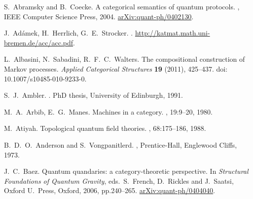 \begin{thebibliography}{RSW00}

    S.\ Abramsky and B.\ Coecke.
    \newblock A categorical semantics of quantum protocols.
    , IEEE Computer Science Press, 2004.
    \newblock \href{http://arxiv.org/abs/quant-ph/0402130}{arXiv:quant-ph/0402130}.

    J.\ Ad\'amek, H.\ Herrlich, G.\ E.\ Strocker. 
    .
    \newblock
    \href{http://katmat.math.uni-bremen.de/acc/acc.pdf}{http://katmat.math.uni-bremen.de/acc/acc.pdf}.



    L.\ Albasini, N.\ Sabadini, R.\ F.\ C.\ Walters. 
    \newblock The compositional construction of Markov processes.
    \newblock \emph{Applied Categorical Structures} {\bf 19} (2011), 425--437. 
    \newblock doi: 10.1007/s10485-010-9233-0.

    S.\ J.\ Ambler. 
    . 
    \newblock PhD thesis, University of Edinburgh, 1991.

    M.\ A.\ Arbib, E.\ G.\ Manes. 
    \newblock Machines in a category.
    , 19:9--20, 1980.


     M.\ Atiyah. 
    \newblock Topological quantum field theories.
    , 68:175--186, 1988. 

    B.\ D.\ O.\ Anderson and S.\ Vongpanitlerd. 
    , Prentice-Hall, Englewood Cliffs, 1973.

    J.\ C.\ Baez. 
    \newblock Quantum quandaries: a category-theoretic
    perspective. 
    \newblock In {\sl Structural Foundations of Quantum Gravity}, eds.\
    S.\ French, D.\ Rickles and J.\ Saatsi, Oxford U.\ Press, Oxford,
    2006, pp.240--265. 
    \newblock \href{http://arxiv.org/abs/quant-ph/0404040}
    {arXiv:quant-ph/0404040}.


\end{thebibliography}
